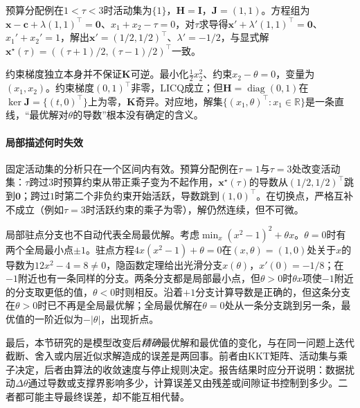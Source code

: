 预算分配例在$1<\tau<3$时活动集为$\{1\}$，$\bm H=\bm I$，$\bm J=(1,1)$。方程组为$\bm x-\bm c+\lambda(1,1)^\top=\bm0$、$x_1+x_2-\tau=0$，对$\tau$求导得$\bm x'+\lambda'(1,1)^\top=\bm0$、$x_1'+x_2'=1$，解出$\bm x'=(1/2,1/2)^\top$、$\lambda'=-1/2$，与显式解$\bm x^\star(\tau)=((\tau+1)/2,(\tau-1)/2)^\top$一致。

约束梯度独立本身并不保证$\bm K$可逆。最小化$\frac12x_2^2$、约束$x_2-\theta=0$，变量为$(x_1,x_2)$。约束梯度$(0,1)^\top$非零，LICQ成立；但$\bm H=\operatorname{diag}(0,1)$在$\ker\bm J=\{(t,0)^\top\}$上为零，$\bm K$奇异。对应地，解集$\{(x_1,\theta)^\top:x_1\in\mathbb R\}$是一条直线，“最优解对$\theta$的导数”根本没有确定的含义。

\paragraph{局部描述何时失效}
固定活动集的分析只在一个区间内有效。预算分配例在$\tau=1$与$\tau=3$处改变活动集：$\tau$跨过$3$时预算约束从带正乘子变为不起作用，$\bm x^\star(\tau)$的导数从$(1/2,1/2)^\top$跳到$\bm0$；跨过$1$时第二个非负约束开始活跃，导数跳到$(1,0)^\top$。在切换点，严格互补不成立（例如$\tau=3$时活跃约束的乘子为零），解仍然连续，但不可微。

局部驻点分支也不自动代表全局最优解。考虑$\min_x(x^2-1)^2+\theta x$。$\theta=0$时有两个全局最小点$\pm1$。驻点方程$4x(x^2-1)+\theta=0$在$(x,\theta)=(1,0)$处关于$x$的导数为$12x^2-4=8\neq0$，隐函数定理给出光滑分支$x(\theta)$，$x'(0)=-1/8$；在$-1$附近也有一条同样的分支。两条分支都是局部最小点，但$\theta>0$时$\theta x$项使$-1$附近的分支取更低的值，$\theta<0$时则相反。沿着$+1$分支计算导数是正确的，但这条分支在$\theta>0$时已不再是全局最优解；全局最优解在$\theta=0$处从一条分支跳到另一条，最优值的一阶近似为$-|\theta|$，出现折点。

最后，本节研究的是模型改变后\emph{精确}最优解和最优值的变化，与在同一问题上迭代截断、舍入或内层近似求解造成的误差是两回事。前者由KKT矩阵、活动集与乘子决定，后者由算法的收敛速度与停止规则决定。报告结果时应分开说明：数据扰动$\Delta\theta$通过导数或支撑界影响多少，计算误差又由残差或间隙证书控制到多少。二者都可能主导最终误差，却不能互相代替。
